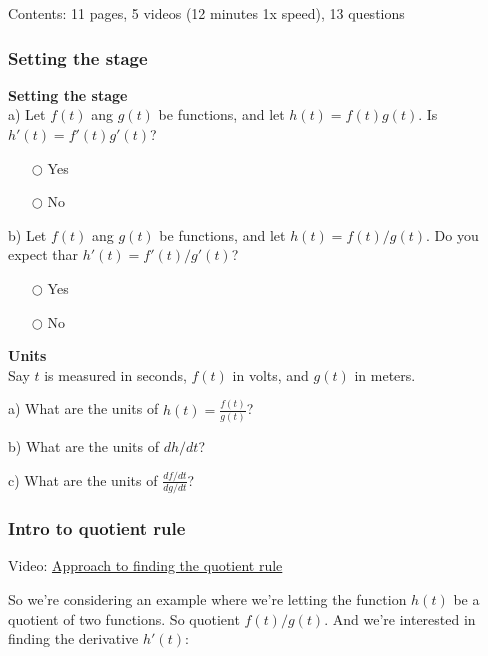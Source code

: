 \documentclass[pdftex, brazil, 12pt, twoside]{article}
\begin{document}
Contents: 11 pages, 5 videos (12 minutes 1x speed), 13 questions

\subsubsection{Setting the stage}
\label{u2-quotient-rule-stage}

\begin{exercise}
  \textbf{Setting the stage}\\%
  a) Let $f(t)$ ang $g(t)$ be functions, and let $h(t) = f(t)g(t)$. Is $h'(t) = f'(t)g'(t)$?
  \begin{itemize}[noitemsep]
  \item[$\bigcirc$] Yes
  \item[$\bigcirc$] No
  \end{itemize}

  b) Let $f(t)$ ang $g(t)$ be functions, and let $h(t) = f(t)/g(t)$. Do you expect
  thar $h'(t) = f'(t)/g'(t)$?
  \begin{itemize}[noitemsep]
  \item[$\bigcirc$] Yes
  \item[$\bigcirc$] No
  \end{itemize}
\end{exercise}

\begin{exercise}
  \textbf{Units}\\%
  Say $t$ is measured in seconds, $f(t)$ in volts, and $g(t)$ in meters.

  a) What are
  the units of $h(t)=\frac{f(t)}{g(t)}$?

  b) What are the units of $dh/dt$?

  c) What are the units of $\displaystyle \frac{df/dt}{dg/dt}$?
\end{exercise}

\subsubsection{Intro to quotient rule}
\label{u2-quotient-rule-intro}

Video: \href{https://www.youtube.com/watch?v=OedPIjJfe-U}{Approach to finding the
  quotient rule}

So we're considering an example where
we're letting the function $h(t)$
be a quotient of two functions.
So quotient $f(t) / g(t)$.
And we're interested in finding the derivative $h'(t)$:
\end{document}
